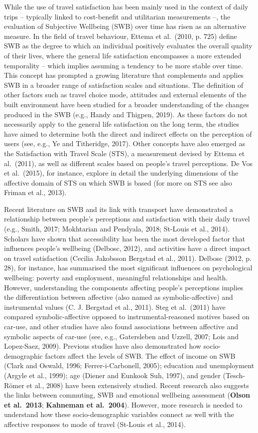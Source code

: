 \documentclass[]{elsarticle} %
\begin{document}
While the use of travel satisfaction has been mainly used in the context
of daily trips -- typically linked to cost-benefit and utilitarian
measurements --, the evaluation of Subjective Wellbeing (SWB) over time
has risen as an alternative measure. In the field of travel behaviour,
Ettema et al.~(2010, p. 725) define SWB as the degree to which an
individual positively evaluates the overall quality of their lives,
where the general life satisfaction encompasses a more extended
temporality -- which implies assuming a tendency to be more stable over
time. This concept has prompted a growing literature that complements
and applies SWB in a broader range of satisfaction scales and
situations. The definition of other factors such as travel choice mode,
attitudes and external elements of the built environment have been
studied for a broader understanding of the changes produced in the SWB
(e.g., Handy and Thigpen, 2019). As these factors do not necessarily
apply to the general life satisfaction on the long term, the studies
have aimed to determine both the direct and indirect effects on the
perception of users (see, e.g., Ye and Titheridge, 2017). Other concepts
have also emerged as the Satisfaction with Travel Scale (STS), a
measurement devised by Ettema et al.~(2011), as well as different scales
based on people's travel perceptions. De Vos et al.~(2015), for
instance, explore in detail the underlying dimensions of the affective
domain of STS on which SWB is based (for more on STS see also Friman et
al., 2013).

Recent literature on SWB and its link with transport have demonstrated a
relationship between people's perceptions and satisfaction with their
daily travel (e.g., Smith, 2017; Mokhtarian and Pendyala, 2018; St-Louis
et al., 2014). Scholars have shown that accessibility has been the most
developed factor that influences people's wellbeing (Delbosc, 2012), and
activities have a direct impact on travel satisfaction (Cecilia
Jakobsson Bergstad et al., 2011). Delbosc (2012, p. 28), for instance,
has summarised the most significant influences on psychological
wellbeing: poverty and employment, meaningful relationships and health.
However, understanding the components affecting people's perceptions
implies the differentiation between affective (also named as
symbolic-affective) and instrumental values (C. J. Bergstad et al.,
2011). Steg et al.~(2011) have compared symbolic-affective opposed to
instrumental-reasoned motives based on car-use, and other studies have
also found associations between affective and symbolic aspects of
car-use (see, e.g., Gatersleben and Uzzell, 2007; Lois and Lopez-Saez,
2009). Previous studies have also demonstrated how socio-demographic
factors affect the levels of SWB. The effect of income on SWB (Clark and
Oswald, 1996; Ferrer-i-Carbonell, 2005); education and unemployment
(Argyle et al., 1999); age (Diener and Eunkook Suh, 1997), and gender
(Tesch-Römer et al., 2008) have been extensively studied. Recent
research also suggests the links between commuting, SWB and emotional
wellbeing assessment (\textbf{Olson et al.~2013}; \textbf{Kahneman et
al.~2004}). However, more research is needed to understand how these
socio-demographic variables connect as well with the affective responses
to mode of travel (St-Louis et al., 2014).
\end{document}
